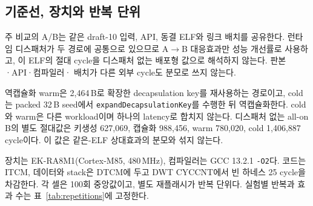 \documentclass[runningheads,orivec]{llncs}
\begin{document}
\subsection{기준선, 장치와 반복 단위}

주 비교의 A/B는 같은 draft-10 입력, API, 동결 ELF와 링크 배치를 공유한다. 런타임
디스패처가 두 경로에 공통으로 있으므로 A$\to$B 대응효과만 성능 개선률로 사용하고,
이 ELF의 절대 cycle을 디스패처 없는 배포형 값으로 해석하지 않는다. 판본·API·컴파일러·
배치가 다른 외부 cycle도 분모로 쓰지 않는다.

역캡슐화 warm은 2,464\,B로 확장한 decapsulation key를 재사용하는 경로이고, cold는
packed 32\,B seed에서 \texttt{expandDecapsulationKey}를 수행한 뒤 역캡슐화한다.
cold와 warm은 다른 workload이며 하나의 latency로 합치지 않는다. 디스패처 없는 all-on
B의 별도 절대값은 키생성 627,069, 캡슐화 988,456, warm 780,020, cold
1,406,887 cycle이다. 이 값은 같은-ELF 상대효과의 분모와 섞지 않는다.

장치는 EK-RA8M1(Cortex-M85, 480\,MHz), 컴파일러는 GCC 13.2.1 \texttt{-O2}다.
코드는 ITCM, 데이터와 stack은 DTCM에 두고 DWT CYCCNT에서 빈 하네스 25 cycle을
차감한다. 각 셀은 100회 중앙값이고, 별도 재플래시가 반복 단위다. 실험별 반복과
효과 수는 표~\ref{tab:repetitions}에 고정한다.
\end{document}
